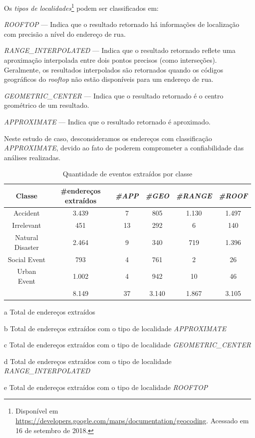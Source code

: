 \documentclass[
	12pt,				%
	oneside,			%
	a4paper,			%
	english,			%
	brazil				%
	]{abntex2ppgsi}
\begin{document}
{{Os \textit{tipos de localidades}\footnote{Disponível em \url{https://developers.google.com/maps/documentation/geocoding}. Acessado em 16 de setembro de 2018.} podem ser classificados em:
\begin{enumerate*}
\item \textit{ROOFTOP} --- Indica que o resultado retornado há informações de localização com precisão a nível do endereço de rua.
\item \textit{RANGE\_INTERPOLATED} --- Indica que o resultado retornado reflete uma aproximação interpolada entre dois pontos precisos (como interseções). Geralmente, os resultados interpolados são retornados quando os códigos geográficos do \textit{rooftop} não estão disponíveis para um endereço de rua.
\item \textit{GEOMETRIC\_CENTER} --- Indica que o resultado retornado é o centro geométrico de um resultado.
\item \textit{APPROXIMATE} --- Indica que o resultado retornado é aproximado.
\end{enumerate*}

Neste estudo de caso, desconsideramos os endereços com classificação \textit{APPROXIMATE}, devido ao fato de poderem comprometer a confiabilidade das análises realizadas. 

\begin{table}[!htb]
\centering
\caption {Quantidade de eventos extraídos por classe}
\label {tab:qtdExtractedAddresses}
\begin{threeparttable}
\begin{tabular}{c|c|c|c|c|c}
\toprule
\textbf{Classe} & \textbf{\#endereços extraídos\tnote{a}} & \textbf{\textit{\#APP\tnote{b}}} & \textbf{\textit{\#GEO\tnote{c}}} & \textbf{\textit{\#RANGE\tnote{d}}} & \textbf{\textit{\#ROOF\tnote{e}}} \\
\midrule
Accident & 3.439 & 7 & 805 & 1.130 & 1.497 \\
\hline
Irrelevant & 451 & 13 & 292 & 6 & 140 \\
\hline
Natural Disaster & 2.464 & 9 & 340 & 719 & 1.396 \\
\hline
Social Event & 793 & 4 & 761 & 2 & 26 \\
\hline
Urban Event & 1.002 & 4 & 942 & 10 & 46 \\
\midrule
{} & 8.149 & 37 & 3.140 & 1.867 & 3.105 \\
\bottomrule
\end{tabular}
\begin{tablenotes}
\item[a] Total de endereços extraídos
\item[b] Total de endereços extraídos com o tipo de localidade \textit{APPROXIMATE}
\item[c] Total de endereços extraídos com o tipo de localidade \textit{GEOMETRIC\_CENTER}
\item[d] Total de endereços extraídos com o tipo de localidade \textit{RANGE\_INTERPOLATED}
\item[e] Total de endereços extraídos com o tipo de localidade \textit{ROOFTOP}
\end{tablenotes}
\end{threeparttable}
\end{table}


}}
\end{document}

